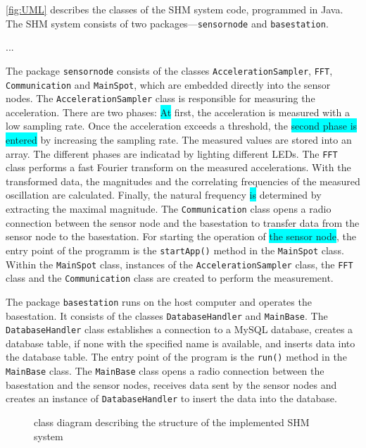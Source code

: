 \documentclass[12pt,a4paper]{scrartcl}
\begin{document}
\autoref{fig:UML} describes the classes of the SHM system code, programmed in Java.
The SHM system consists of two packages---\texttt{sensornode} and \texttt{basestation}.

...

The package \texttt{sensornode} consists of the classes \texttt{Acceleration\-Sampler}, \texttt{FFT}, \texttt{Communication} and \texttt{MainSpot}, which are embedded directly into the sensor nodes.
The \texttt{AccelerationSampler} class is responsible for measuring the acceleration.
There are two phases: \colorbox{cyan}{At} first, the acceleration is measured with a low sampling rate.
Once the acceleration exceeds a threshold, the \colorbox{cyan}{second phase is entered} by increasing the sampling rate. 
The measured values are stored into an array.
The different phases are indicatad by lighting different LEDs.
The \texttt{FFT} class performs a fast Fourier transform on the measured accelerations. 
With the transformed data, the magnitudes and the correlating frequencies of the measured oscillation are calculated.
Finally, the natural frequency \colorbox{cyan}{is} determined by extracting the maximal magnitude.
The \texttt{Communication} class opens a radio connection between the sensor node and the basestation to transfer data from the sensor node to the basestation.
For starting the operation of \colorbox{cyan}{the sensor node}, the entry point of the programm is the \texttt{startApp()} method in the \texttt{MainSpot} class. 
Within the \texttt{MainSpot} class, instances of the \texttt{Acceleration\-Sampler} class, the \texttt{FFT} class and the \texttt{Communication} class are created to perform the measurement.

The package \texttt{basestation} runs on the host computer and operates the basestation.
It consists of the classes \texttt{Database\-Handler} and \texttt{MainBase}.
The \texttt{Database\-Handler} class establishes a connection to a MySQL database, creates a database table, if none with the specified name is available, and inserts data into the database table.
The entry point of the program is the \texttt{run()} method in the \texttt{MainBase} class. The \texttt{MainBase} class opens a radio connection between the basestation and the sensor nodes, receives data sent by the sensor nodes and creates an instance of \texttt{Database\-Handler} to insert the data into the database.

\begin{figure}[htb]
    \centering
    \caption{class diagram describing the structure of the implemented SHM system}
    \label{fig:UML}
\end{figure}
\end{document}
